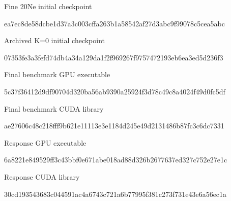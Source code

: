 \par\noindent\begin{minipage}{\linewidth}
Fine 20Ne initial checkpoint\par
{\footnotesize\ttfamily ea7ec8de58dcbe1d37a3c003cffa263b1a58542af27d3abc9f99078c5cea5abc}\par
\end{minipage}\par\smallskip
\par\noindent\begin{minipage}{\linewidth}
Archived K=0 initial checkpoint\par
{\footnotesize\ttfamily 07353fe3a3fefd74db4a34a129da1f2f969267f9757472193eb6ea3ed5d236f3}\par
\end{minipage}\par\smallskip
\par\noindent\begin{minipage}{\linewidth}
Final benchmark GPU executable\par
{\footnotesize\ttfamily 5c37f36412d9df90704d320ba56ab9390a25924f3d78c49c8a4024f49d0fc5df}\par
\end{minipage}\par\smallskip
\par\noindent\begin{minipage}{\linewidth}
Final benchmark CUDA library\par
{\footnotesize\ttfamily ae27606c48c218fff9b621e11113e3e1184d245e49d2131486b87fc3c6dc7331}\par
\end{minipage}\par\smallskip
\par\noindent\begin{minipage}{\linewidth}
Response GPU executable\par
{\footnotesize\ttfamily 6a8221e849529ff3c43bbf0e671abe018ad88d326b2677637ed327c752e27e1c}\par
\end{minipage}\par\smallskip
\par\noindent\begin{minipage}{\linewidth}
Response CUDA library\par
{\footnotesize\ttfamily 30cd193543683c044591ac4a6743c721a6b77995f381c273f731e43e6a56ec1a}\par
\end{minipage}\par\smallskip
